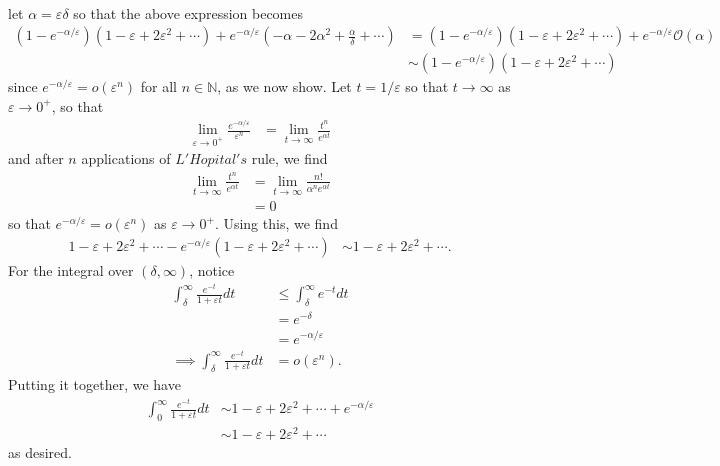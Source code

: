 \documentclass{article}
\begin{document}
\begin{itemize}
\begin{itemize}
\begin{align*}
        \end{align*}
        let $\alpha = \varepsilon\delta$ so that the above expression becomes
        \begin{align*}
            (1 - e^{-\alpha/\varepsilon})(1 - \varepsilon + 2\varepsilon^2 + \cdots) + e^{-\alpha/\varepsilon}(- \alpha - 2\alpha^2 + \frac{\alpha}{\delta}+ \cdots) &= (1 - e^{-\alpha/\varepsilon})(1 - \varepsilon + 2\varepsilon^2 + \cdots) + e^{-\alpha/\varepsilon}\mathcal{O}(\alpha)\\
            &\sim (1 - e^{-\alpha/\varepsilon})(1 - \varepsilon + 2\varepsilon^2 + \cdots) 
        \end{align*}
        since $e^{-\alpha/\varepsilon} = o(\varepsilon^{n})$ for all $n \in \mathbb{N}$, as we now show. Let $t = 1/\varepsilon$ so that $t \to \infty$ as $\varepsilon \to 0^+$, so that
        \begin{align*}
            \lim_{\varepsilon \to 0^+}\frac{e^{-\alpha/\varepsilon}}{\varepsilon^n} &= \lim_{t \to \infty}\frac{t^n}{e^{\alpha t}}
        \end{align*}
        and after $n$ applications of $L'Hopital's$ rule, we find
        \begin{align*}
            \lim_{t \to \infty}\frac{t^n}{e^{\alpha t}} &= \lim_{t \to \infty}\frac{n!}{\alpha^ne^{\alpha t}}\\
            &= 0
        \end{align*}
        so that $e^{-\alpha/\varepsilon} = o(\varepsilon^n)$ as $\varepsilon \to 0^+$. Using this, we find
        \begin{align*}
            1 - \varepsilon + 2\varepsilon^2 + \cdots - e^{-\alpha/\varepsilon}(1 - \varepsilon + 2\varepsilon^2 + \cdots) &\sim 1 - \varepsilon + 2\varepsilon^2 + \cdots.
        \end{align*}
        For the integral over $(\delta, \infty)$, notice
        \begin{align*}
            \int_{\delta}^{\infty}\frac{e^{-t}}{1 + \varepsilon t}dt &\leq \int_{\delta}^{\infty} e^{-t}dt\\
            &= e^{-\delta}\\
            &= e^{-\alpha/\varepsilon}\\
            \implies \int_{\delta}^{\infty} \frac{e^{-t}}{1 + \varepsilon t}dt &= o(\varepsilon^n).
        \end{align*}
        Putting it together, we have
        \begin{align*}
            \int_0^{\infty} \frac{e^{-t}}{1 + \varepsilon t}dt &\sim 1 - \varepsilon + 2\varepsilon^2 + \cdots + e^{-\alpha/\varepsilon}\\
            &\sim 1 - \varepsilon + 2\varepsilon^2 + \cdots
        \end{align*}
        as desired.
        

\end{itemize}
\end{itemize}
\end{document}
